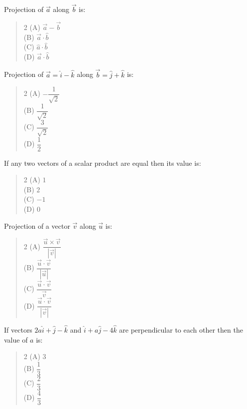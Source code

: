 \documentclass[11pt,a4paper]{article}
\begin{document}
\begin{mcqlist}
\item Projection of $\vec{a}$ along $\vec{b}$ is:
\begin{quote}\begin{multicols}{2}
\noindent (A) $\vec{a}-\vec{b}$ \\
(B) $\vec{a}\cdot\hat{b}$ \\
(C) $\hat{a}\cdot\hat{b}$ \\
(D) $\vec{a}\cdot\hat{b}$
\end{multicols}\end{quote}

\item Projection of $\vec{a}=\hat{i}-\hat{k}$ along $\vec{b}=\hat{j}+\hat{k}$ is:
\begin{quote}\begin{multicols}{2}
\noindent (A) $-\dfrac{1}{\sqrt{2}}$ \\
(B) $\dfrac{1}{\sqrt{2}}$ \\
(C) $\dfrac{3}{\sqrt{2}}$ \\
(D) $\dfrac{1}{2}$
\end{multicols}\end{quote}

\item If any two vectors of a scalar product are equal then its value is:
\begin{quote}\begin{multicols}{2}
\noindent (A) $1$ \\
(B) $2$ \\
(C) $-1$ \\
(D) $0$
\end{multicols}\end{quote}

\item Projection of a vector $\vec{v}$ along $\vec{u}$ is:
\begin{quote}\begin{multicols}{2}
\noindent (A) $\dfrac{\vec{u}\times\vec{v}}{|\vec{v}|}$ \\
(B) $\dfrac{\vec{u}\cdot\vec{v}}{|\vec{u}|}$ \\
(C) $\dfrac{\vec{u}\cdot\vec{v}}{\vec{v}}$ \\
(D) $\dfrac{\vec{u}\cdot\vec{v}}{|\vec{v}|}$
\end{multicols}\end{quote}

\item If vectors $2a\hat{i}+\hat{j}-\hat{k}$ and $\hat{i}+a\hat{j}-4\hat{k}$ are perpendicular to each other then the value of $a$ is:
\begin{quote}\begin{multicols}{2}
\noindent (A) $3$ \\
(B) $\dfrac{1}{3}$ \\
(C) $\dfrac{2}{3}$ \\
(D) $\dfrac{4}{3}$
\end{multicols}\end{quote}


\end{mcqlist}
\end{document}
